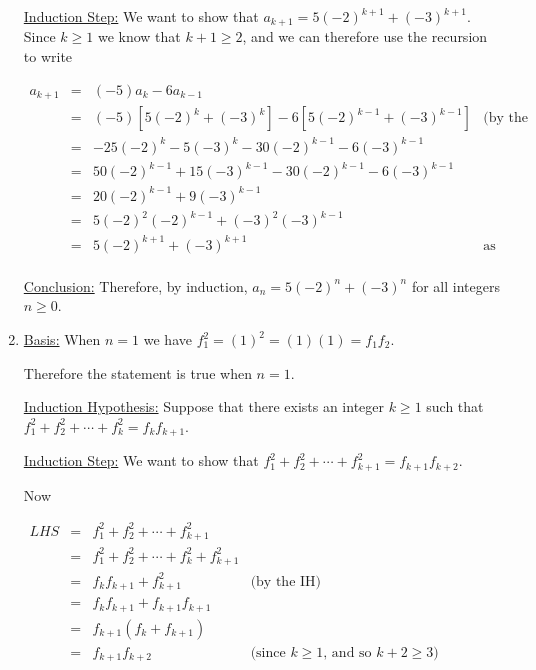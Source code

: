 \documentclass[11 pt]{article}%
\begin{document}
\begin{enumerate}
\underline{Induction Step:} We want to show that $a_{k+1} = 5(-2)^{k+1} + (-3)^{k+1}$. Since $k\geq 1$ we know that $k+1\geq 2$, and we can therefore use the recursion to write
\begin{center}
$\begin{array}{cclr}
a_{k+1} & = & (-5)a_k -6 a_{k-1} & \\
 & = & (-5)[5(-2)^k + (-3)^k] - 6[5(-2)^{k-1} + (-3)^{k-1}] & \mbox{(by the IH)} \\
 & = & -25(-2)^k - 5(-3)^k - 30(-2)^{k-1} - 6 (-3)^{k-1} & \\
 & = & 50 (-2)^{k-1} + 15 (-3)^{k-1} -30(-2)^{k-1} - 6(-3)^{k-1} & \\
 & = & 20 (-2)^{k-1} + 9 (-3)^{k-1} & \\
 & = & 5 (-2)^2 (-2)^{k-1} + (-3)^2 (-3)^{k-1} & \\
 & = & 5 (-2)^{k+1} + (-3)^{k+1} & \mbox{as wanted.}\\
\end{array}$
\end{center}

\underline{Conclusion:} Therefore, by induction, $a_n = 5(-2)^n + (-3)^n$ for all integers $n\geq 0$.


\item 
\underline{Basis:} When $n=1$ we have $f_1^2 = (1)^2 = (1)(1) = f_1f_2$. 

Therefore the statement is true when $n=1$.

\underline{Induction Hypothesis:} Suppose that there exists an integer $k\geq 1$ such that $f_1^2 + f_2^2 + \cdots + f_k^2 = f_{k}f_{k+1}$.

\underline{Induction Step:} We want to show that $f_1^2 + f_2^2 + \cdots + f_{k+1}^2 = f_{k+1}f_{k+2}$. 

Now
\begin{center}
$\begin{array}{cclr}
LHS & = & f_1^2 + f_2^2 + \cdots + f_{k+1}^2  & \\
 & = & f_1^2 + f_2^2 + \cdots + f_k^2+ f_{k+1}^2  &  \\
 & = & f_k f_{k+1} + f_{k+1}^2 & \mbox{(by the IH)}\\
 & = & f_k f_{k+1} + f_{k+1} f_{k+1} & \\
 & = & f_{k+1}(f_k + f_{k+1}) & \\
 & = & f_{k+1} f_{k+2} & \mbox{(since $k\geq 1$, and so $k+2 \geq 3$)}
\end{array}$
\end{center}


\end{enumerate}
\end{document}

